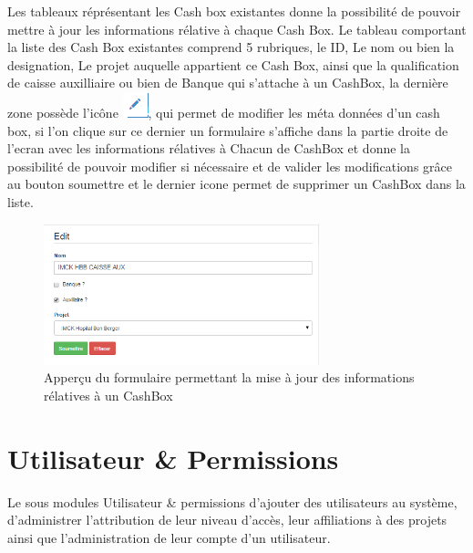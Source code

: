 \documentclass[12pt,a4paper]{report}
\begin{document}
Les tableaux réprésentant les Cash box existantes donne la possibilité de pouvoir mettre à jour les informations rélative à chaque Cash Box. Le tableau comportant la liste des Cash Box existantes comprend 5 rubriques, le ID, Le nom ou bien la designation, Le projet auquelle appartient ce Cash Box, ainsi que la qualification de caisse auxilliaire ou bien de Banque qui s'attache à un CashBox, la dernière  zone possède l'icône \includegraphics[scale=0.7]{pic/EditUser.png}, qui permet de modifier les méta données d'un cash box, si l'on clique sur ce dernier un formulaire s'affiche dans la partie droite de l'ecran avec les informations rélatives à Chacun de CashBox et donne la possibilité de pouvoir modifier si nécessaire et de valider les modifications grâce au bouton soumettre et le dernier icone permet de supprimer un CashBox dans la liste.
\begin{figure}[h]
\begin{center}
\includegraphics[width=8cm]{pic/EditCashBox.png}
\end{center}
\caption{Apperçu du formulaire permettant la mise à jour des informations rélatives à un CashBox}
\label{Apperçu du formulaire permettant la mise à jour des informations rélatives à un CashBox}
\end{figure} 


\newpage
\section{Utilisateur \& Permissions}
Le sous modules Utilisateur \& permissions d'ajouter des utilisateurs au système, d'administrer l'attribution de leur niveau d'accès, leur affiliations à des projets ainsi que l'administration de leur compte d'un utilisateur.
\end{document}

